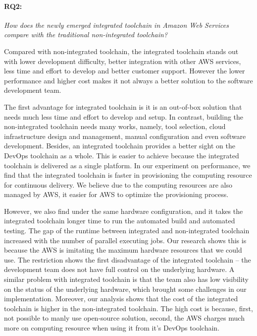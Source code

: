 \paragraph{RQ2:} \textit{How does the newly emerged integrated toolchain in Amazon Web Services compare with the traditional non-integrated toolchain?}
\medskip
\par
Compared with non-integrated toolchain, the integrated toolchain stands out with lower development difficulty, better integration with other AWS services, less time and effort to develop and better customer support. However the lower performance and higher cost makes it not always a better solution to the software development team.
\par
The first advantage for integrated toolchain is it is an out-of-box solution that needs much less time and effort to develop and setup. In contrast, building the non-integrated toolchain needs many works, namely, tool selection, cloud infrastructure design and management, manual configuration and even software development. Besides, an integrated toolchain provides a better sight on the DevOps toolchain as a whole. This is easier to achieve because the integrated toolchain is delivered as a single platform. In our experiment on performance, we find that the integrated toolchain is faster in provisioning the computing resource for continuous delivery. We believe due to the computing resources are also managed by AWS, it easier for AWS to optimize the provisioning process.
\par
However, we also find under the same hardware configuration, and it takes the integrated toolchain longer time to run the automated build and automated testing. The gap of the runtime between integrated and non-integrated toolchain increased with the number of parallel executing jobs.
Our research shows this is because the AWS is imitating the maximum hardware resources that we could use. The restriction shows the first disadvantage of the integrated toolchain -- the development team does not have full control on the underlying hardware. A similar problem with integrated toolchain is that the team also has low visibility on the status of the underlying hardware, which brought some challenges in our implementation. Moreover, our analysis shows that the cost of the integrated toolchain is higher in the non-integrated toolchain. The high cost is because, first, not possible to manly use open-source solution, second, the AWS charges much more on computing resource when using it from it's DevOps toolchain.

